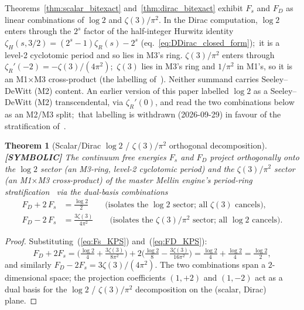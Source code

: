 \documentclass[11pt,a4paper]{article}
\theoremstyle{plain}
\newtheorem{theorem}{Theorem}[section]
\theoremstyle{definition}
\begin{document}
Theorems~\ref{thm:scalar_bitexact} and~\ref{thm:dirac_bitexact}
exhibit $F_{s}$ and $F_{D}$ as linear combinations of $\log 2$ and
$\zeta(3)/\pi^{2}$. In the Dirac computation, $\log 2$ enters through
the $2^{s}$ factor of the half-integer Hurwitz identity
$\zeta_{H}(s, 3/2) = (2^{s} - 1)\zeta_{R}(s) - 2^{s}$
(eq.~\ref{eq:DDirac_closed_form});\ it is a level-2 cyclotomic period
and so lies in M3's ring. $\zeta(3)/\pi^{2}$ enters through
$\zeta_{R}'(-2) = -\zeta(3)/(4\pi^{2})$;\ $\zeta(3)$ lies in M3's ring
and $1/\pi^{2}$ in M1's, so it is an M1$\times$M3 cross-product (the
labelling of~\cite{paper55}). Neither summand carries Seeley--DeWitt
(M2) content. An earlier version of this paper labelled $\log 2$ as a
Seeley--DeWitt (M2) transcendental, via $\zeta_{R}'(0)$, and read the two
combinations below as an M2/M3 split;\ that labelling is withdrawn
(2026-09-29) in favour of the stratification of~\cite{paper18}.

\begin{theorem}[Scalar/Dirac $\log 2$ / $\zeta(3)/\pi^{2}$ orthogonal decomposition]
\label{thm:mellin_decomp}
\textbf{[SYMBOLIC]} The continuum free energies $F_{s}$ and $F_{D}$
project orthogonally onto the $\log 2$ sector (an M3-ring, level-2
cyclotomic period) and the $\zeta(3)/\pi^{2}$ sector (an M1$\times$M3
cross-product) of the master Mellin engine's period-ring
stratification~\cite{paper18} via the dual-basis combinations
\begin{align}
F_{D} + 2\,F_{s} &= \frac{\log 2}{2}
\qquad\text{(isolates the $\log 2$ sector; all $\zeta(3)$ cancels),}
\label{eq:log2_isolation}\\
F_{D} - 2\,F_{s} &= \frac{3\zeta(3)}{4\pi^{2}}
\qquad\text{(isolates the $\zeta(3)/\pi^{2}$ sector; all $\log 2$ cancels).}
\label{eq:zeta3_isolation}
\end{align}
\end{theorem}

\begin{proof}
Substituting~(\ref{eq:Fs_KPS}) and~(\ref{eq:FD_KPS}):
\[
F_{D} + 2 F_{s} = \bigl(\tfrac{\log 2}{4} + \tfrac{3\zeta(3)}{8\pi^{2}}\bigr)
+ 2 \bigl(\tfrac{\log 2}{8} - \tfrac{3\zeta(3)}{16\pi^{2}}\bigr)
= \tfrac{\log 2}{4} + \tfrac{\log 2}{4} = \tfrac{\log 2}{2},
\]
and similarly $F_{D} - 2 F_{s} = 3 \zeta(3)/(4\pi^{2})$. The two
combinations span a $2$-dimensional space; the projection
coefficients $(1, +2)$ and $(1, -2)$ act as a dual basis for the
$\log 2$ / $\zeta(3)/\pi^{2}$ decomposition on the (scalar, Dirac) plane.
\end{proof}
\end{document}
